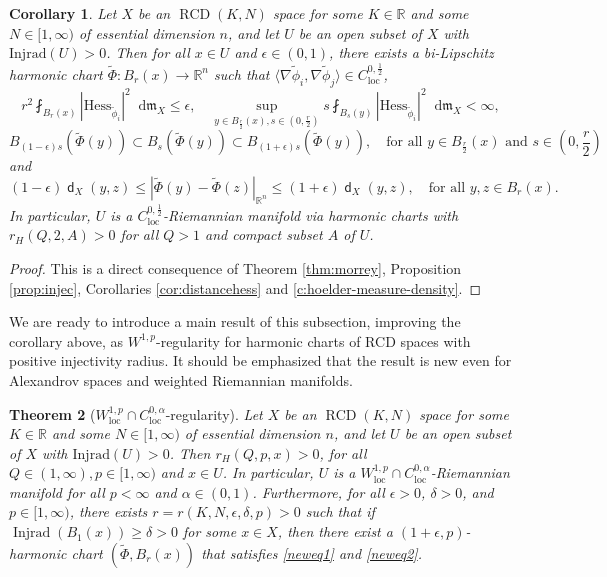\documentclass[11pt,reqno]{amsart}
\newtheorem{theorem}{Theorem}[section]
\newtheorem{corollary}[theorem]{Corollary}
\theoremstyle{definition}
\numberwithin{equation}{section}
\newcommand{\di}{\mathop{}\!\mathrm{d}}
\newcommand{\meas}{\mathfrak{m}}
\DeclareMathOperator{\dist}{\mathsf{d}}
\DeclareMathOperator{\Injrad}{Injrad}
\DeclareMathOperator{\loc}{loc}
\DeclareMathOperator{\RCD}{RCD}
\begin{document}
\begin{corollary}\label{existence proof}
    Let $X$ be an $\RCD(K, N)$ space for some $K \in \mathbb{R}$ and some $N \in [1, \infty)$ of essential dimension $n$, and let $U$ be an open subset of $X$ with $\mathrm{Injrad}(U)>0$.  
    Then 
     for all $x \in U$ and $\epsilon \in (0,1)$, there exists a bi-Lipschitz harmonic chart $\tilde \Phi:B_r(x) \to \mathbb{R}^n$ such that $\langle \nabla \tilde \phi_i, \nabla \tilde \phi_j\rangle \in C^{0,\frac{1}{2}}_{\loc}$, 
    \begin{equation}\label{asa9sarsasproasn}
        r^2\fint_{B_r(x)}|\mathrm{Hess}_{\tilde{\phi}_i}|^2\di \meas_X\le \epsilon, \quad \sup_{y \in B_{\frac{r}{2}}(x), s \in (0, \frac{r}{2})}s\fint_{B_s(y)}|\mathrm{Hess}_{\tilde \phi_i}|^2\di \meas_X<\infty,
    \end{equation}
    \begin{equation}\label{neweq1}
        B_{(1-\epsilon)s}(\tilde{\Phi}(y))\subset B_s(\tilde \Phi(y))\subset B_{(1+\epsilon)s}(\tilde \Phi(y)),\quad \text{for all $y \in B_{\frac{r}{2}}(x)$ and $s \in \left(0, \frac{r}{2}\right)$}
    \end{equation}
    and 
    \begin{equation}\label{neweq2}
        (1-\epsilon)\dist_X(y,z) \le |\tilde \Phi(y)-\tilde \Phi(z)|_{\mathbb{R}^n}\le (1+\epsilon)\dist_X(y,z),\quad \text{for all $y, z \in B_r(x)$}.
    \end{equation}
    In particular, $U$ is a $C^{0,\frac{1}{2}}_{\loc}$-Riemannian manifold via harmonic charts with 
    $
        r_H(Q, 2, A)>0$ for all $Q>1$ and compact subset $A$ of $U$.
\end{corollary}
\begin{proof}
    This is a direct consequence of Theorem \ref{thm:morrey}, Proposition \ref{prop:injec}, Corollaries \ref{cor:distancehess} and \ref{c:hoelder-measure-density}.
\end{proof}
We are ready to introduce a main result of this subsection, improving the corollary above, as $W^{1,p}$-regularity for harmonic charts of RCD spaces with positive injectivity radius. It should be emphasized that the result is new even for Alexandrov spaces and weighted Riemannian manifolds.
\begin{theorem}[$W^{1,p}_{\loc}\cap C^{0,\alpha}_{\loc}$-regularity]\label{thm:nonsmoothandssasasas}
    Let $X$ be an $\RCD(K, N)$ space for some $K \in \mathbb{R}$ and some $N \in [1, \infty)$ of essential dimension $n$, and let $U$ be an open subset of $X$ with $\mathrm{Injrad}(U)>0$. Then 
   $
        r_H(Q, p, x)>0$, for all $Q \in (1, \infty), p \in [1, \infty)$ and $x \in U$.
    In particular, $U$ is a $W^{1,p}_{\loc}\cap C^{0,\alpha}_{\loc}$-Riemannian manifold for all $p<\infty$ and $\alpha \in (0,1)$. Furthermore, for all $\epsilon > 0$, $\delta > 0$, and $p \in [1, \infty)$, there exists $r = r(K, N, \epsilon, \delta, p) > 0$ such that if $\Injrad(B_1(x))\ge \delta>0$ for some $x \in X$,  then  there exist a $(1+\epsilon, p)$-harmonic chart $(\tilde \Phi, B_r(x))$ that satisfies \eqref{neweq1} and \eqref{neweq2}.
\end{theorem}
\end{document}
